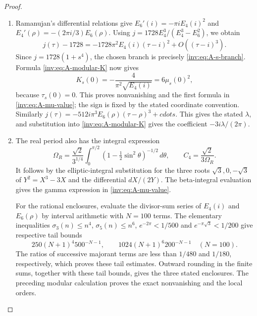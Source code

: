 \begin{proof}
\begin{enumerate}[label=\arabic*.,leftmargin=*]
\item Ramanujan's differential relations give
$E_6'(i)=-\pi i E_4(i)^2$ and
$E_4'(\rho)=-(2\pi i/3)E_6(\rho)$.
Using $j=1728E_4^3/(E_4^3-E_6^2)$, we obtain
\[
j(\tau)-1728=-1728\pi^2E_4(i)(\tau-i)^2+O((\tau-i)^3).
\]
Since $j=1728(1+s^4)$, the chosen branch is precisely
\eqref{inv:eq:A-s-branch}.  Formula \eqref{inv:eq:A-modular-K} now gives
\[
K_s(0)=-\frac4{\pi^2\sqrt{E_4(i)}}=6\mu_s(0)^2,
\]
because $\tau_s(0)=0$.  This proves nonvanishing and the first
formula in \eqref{inv:eq:A-mu-value}; the sign is fixed by the stated
coordinate convention.  Similarly
$j(\tau)=-512i\pi^3E_6(\rho)(\tau-\rho)^3+cdots$.
This gives the stated $\lambda$, and substitution into
\eqref{inv:eq:A-modular-K} gives the coefficient $-3i\lambda/(2\pi)$.

\item The real period also has the integral expression
\[
\Omega_R=\frac{\sqrt2}{3^{1/4}}
\int_0^{\pi/2}(1-\tfrac12\sin^2\theta)^{-1/2}\,d\theta,
\qquad C_4=\frac{\sqrt2}{3\Omega_R}.
\]
It follows by the elliptic-integral substitution for the three roots
$\sqrt3,0,-\sqrt3$ of $Y^2=X^3-3X$ and the differential
$dX/(2Y)$. The beta-integral evaluation gives the gamma expression
in \eqref{inv:eq:A-mu-value}.

For the rational enclosures, evaluate the divisor-sum series of
$E_4(i)$ and $E_6(\rho)$ by interval arithmetic with $N=100$ terms.
The elementary inequalities $\sigma_3(n)\le n^4$,
$\sigma_5(n)\le n^6$, $e^{-2\pi}<1/500$ and
$e^{-\pi\sqrt3}<1/200$ give respective tail bounds
\[
250(N+1)^4 500^{-N-1},\qquad
1024(N+1)^6 200^{-N-1}\quad(N=100).
\]
The ratios of successive majorant terms are less than $1/480$
and $1/180$, respectively, which proves these tail estimates.
Outward rounding in the finite sums, together with these tail bounds,
gives the three stated enclosures. The preceding modular calculation
proves the exact nonvanishing and the local orders.
\end{enumerate}
\end{proof}